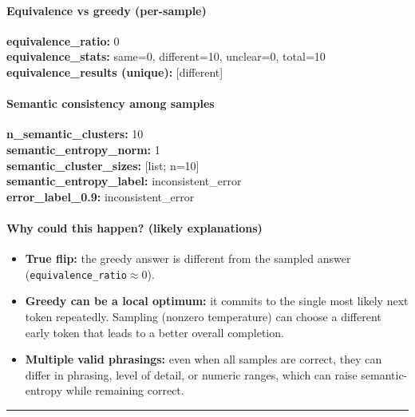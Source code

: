 \documentclass[11pt]{article}
\newcommand{\mono}[1]{\texttt{#1}}
\begin{document}
\paragraph{Equivalence vs greedy (per-sample)}
\textbf{equivalence\_ratio:} 0\\
\textbf{equivalence\_stats:} same=0, different=10, unclear=0, total=10\\
\textbf{equivalence\_results (unique):} [different]\\
\paragraph{Semantic consistency among samples}
\textbf{n\_semantic\_clusters:} 10\\
\textbf{semantic\_entropy\_norm:} 1\\
\textbf{semantic\_cluster\_sizes:} [list; n=10]\\
\textbf{semantic\_entropy\_label:} inconsistent\_error\\
\textbf{error\_label\_0.9:} inconsistent\_error\\
\paragraph{Why could this happen? (likely explanations)}
\begin{itemize}
\item \textbf{True flip:} the greedy answer is different from the sampled answer (\mono{equivalence\_ratio}$\approx 0$).
\item \textbf{Greedy can be a local optimum:} it commits to the single most likely next token repeatedly. Sampling (nonzero temperature) can choose a different early token that leads to a better overall completion.
\item \textbf{Multiple valid phrasings:} even when all samples are correct, they can differ in phrasing, level of detail, or numeric ranges, which can raise semantic-entropy while remaining correct.
\end{itemize}
\vspace{10pt}
\hrule
\vspace{10pt}
\end{document}
